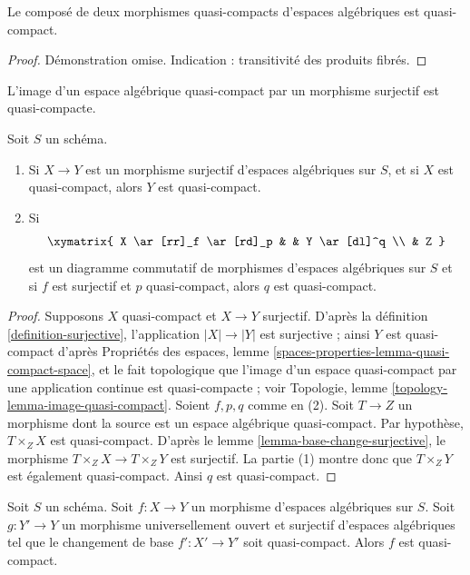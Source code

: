 \begin{lemma}
\label{lemma-composition-quasi-compact}
Le composé de deux morphismes quasi-compacts d'espaces algébriques
est quasi-compact.
\end{lemma}

\begin{proof}
Démonstration omise. Indication : transitivité des produits fibrés.
\end{proof}

\begin{lemma}
\label{lemma-surjection-from-quasi-compact}
\begin{slogan}
L'image d'un espace algébrique quasi-compact par un morphisme surjectif
est quasi-compacte.
\end{slogan}
Soit $S$ un schéma.
\begin{enumerate}
\item Si $X \to Y$ est un morphisme surjectif d'espaces algébriques sur $S$,
et si $X$ est quasi-compact, alors $Y$ est quasi-compact.
\item Si
$$
\xymatrix{
X \ar[rr]_f \ar[rd]_p & &
Y \ar[dl]^q \\
& Z
}
$$
est un diagramme commutatif de morphismes d'espaces algébriques sur $S$
et si $f$ est surjectif et $p$ quasi-compact, alors $q$ est quasi-compact.
\end{enumerate}
\end{lemma}

\begin{proof}
Supposons $X$ quasi-compact et $X \to Y$ surjectif. D'après la
définition \ref{definition-surjective},
l'application $|X| \to |Y|$ est surjective ; ainsi $Y$ est quasi-compact d'après
Propriétés des espaces, lemme \ref{spaces-properties-lemma-quasi-compact-space},
et le fait topologique que l'image d'un espace quasi-compact par une
application continue est quasi-compacte ; voir
Topologie, lemme \ref{topology-lemma-image-quasi-compact}.
Soient $f, p, q$ comme en (2).
Soit $T \to Z$ un morphisme dont la source est un espace algébrique quasi-compact.
Par hypothèse, $T \times_Z X$ est quasi-compact. D'après le
lemme \ref{lemma-base-change-surjective},
le morphisme $T \times_Z X \to T \times_Z Y$ est surjectif.
La partie (1) montre donc que $T \times_Z Y$ est également quasi-compact.
Ainsi $q$ est quasi-compact.
\end{proof}

\begin{lemma}
\label{lemma-descent-quasi-compact}
Soit $S$ un schéma.
Soit $f : X \to Y$ un morphisme d'espaces algébriques sur $S$.
Soit $g : Y' \to Y$ un morphisme universellement ouvert et surjectif
d'espaces algébriques tel que le changement de base $f' : X' \to Y'$ soit quasi-compact.
Alors $f$ est quasi-compact.
\end{lemma}

